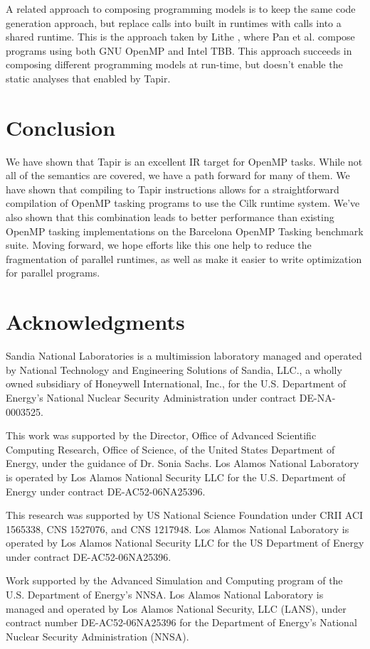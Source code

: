\documentclass[sigconf]{acmart}
\begin{document}
A related approach to composing programming models is to keep the same code
generation approach, but replace calls into built in runtimes with calls into a
shared runtime. This is the approach taken by Lithe \cite{lithe}, where Pan et
al. compose programs using both GNU OpenMP and Intel TBB. This approach succeeds
in composing different programming models at run-time, but doesn't enable the
static analyses that enabled by Tapir.

\section{Conclusion} \label{Sec:Conclusion}
We have shown that Tapir is an excellent IR target for OpenMP tasks. While not
all of the semantics are covered, we have a path forward for many of them. We have
shown that compiling to Tapir instructions allows for a straightforward compilation of 
OpenMP tasking programs to use the Cilk runtime system. We've also shown that this
combination leads to better performance than existing OpenMP tasking implementations
on the Barcelona OpenMP Tasking benchmark suite. Moving forward, we hope efforts like
this one help to reduce the fragmentation of parallel runtimes, as well as make
it easier to write optimization for parallel programs. 

\section*{Acknowledgments}
Sandia National Laboratories is a multimission laboratory managed and operated 
by National Technology and Engineering Solutions of Sandia, LLC., a wholly 
owned subsidiary of Honeywell International, Inc., for the U.S. Department of 
Energy's National Nuclear Security Administration under contract DE-NA-0003525.


This work was supported by the Director, Office of Advanced Scientific
Computing Research, Office of Science, of the United States Department
of Energy, under the guidance of Dr. Sonia Sachs. Los Alamos National
Laboratory is operated by Los Alamos National Security LLC for the U.S.
Department of Energy under contract DE-AC52-06NA25396.

This research was supported by US National Science Foundation under CRII
ACI 1565338, CNS 1527076, and CNS 1217948. Los Alamos National
Laboratory is operated by Los Alamos National Security LLC for the US
Department of Energy under contract DE-AC52-06NA25396.

Work supported by the Advanced Simulation and Computing program of the
U.S. Department of Energy's NNSA\@.  Los Alamos National Laboratory is
managed and operated by Los Alamos National Security, LLC (LANS), under
contract number DE-AC52-06NA25396 for the Department of Energy's
National Nuclear Security Administration (NNSA).



\end{document}
